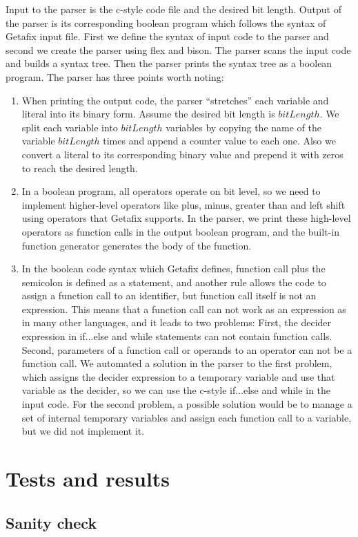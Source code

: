 Input to the parser is the c-style code file and the desired bit length. Output of the parser is its corresponding boolean program which follows the syntax of Getafix input file. First we define the syntax of input code to the parser and second we create the parser using flex and bison. The parser scans the input code and builds a syntax tree. Then the parser prints the syntax tree as a boolean program. The parser has three points worth noting:

\begin{enumerate}
\item When printing the output code, the parser ``stretches'' each variable and literal into its binary form. Assume the desired bit length is $bitLength$. We split each variable into $bitLength$ variables by copying the name of the variable $bitLength$ times and append a counter value to each one. Also we convert a literal to its corresponding binary value and prepend it with zeros to reach the desired length.
\item In a boolean program, all operators operate on bit level, so we need to implement higher-level operators like plus, minus, greater than and left shift using operators that Getafix supports. In the parser, we print these high-level operators as function calls in the output boolean program, and the built-in function generator generates the body of the function.
\item In the boolean code syntax which Getafix defines, function call plus the semicolon is defined as a statement, and another rule allows the code to assign a function call to an identifier, but function call itself is not an expression. This means that a function call can not work as an expression as in many other languages, and it leads to two problems: First, the decider expression in if...else and while statements can not contain function calls. Second, parameters of a function call or operands to an operator can not be a function call. We automated a solution in the parser to the first problem, which assigns the decider expression to a temporary variable and use that variable as the decider, so we can use the c-style if...else and while in the input code. For the second problem, a possible solution would be to manage a set of internal temporary variables and assign each function call to a variable, but we did not implement it.
\end{enumerate}

\section{Tests and results}
\subsection{Sanity check}

